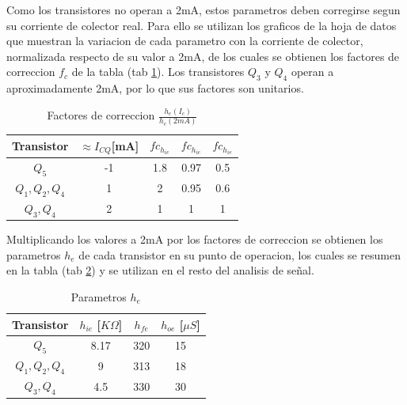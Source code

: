 \documentclass[11pt,a4paper]{article}
\begin{document}
Como los transistores no operan a 2mA, estos parametros deben corregirse segun su corriente de colector real. Para ello se utilizan los graficos de la hoja de datos que muestran la variacion de cada parametro con la corriente de colector, normalizada respecto de su valor a 2mA, de los cuales se obtienen los factores de correccion \(f_c\) de la tabla (tab \ref{tab:fc}). Los transistores \(Q_3\) y \(Q_4\) operan a aproximadamente 2mA, por lo que sus factores son unitarios.

\begin{table}
\centering
\begin{tabular}{ |c|c|c|c|c| }\hline
Transistor         & \(\approx I_{CQ}\)[mA] & \(fc_{h_{ie}}\) & \(fc_{h_{ie}}\) & \(fc_{h_{ie}}\) \\\hline
\(Q_5           \) & -1                     & 1.8             & 0.97            & 0.5             \\\hline
\(Q_1, Q_2, Q_4 \) &  1                     & 2               & 0.95            & 0.6             \\\hline
\(Q_3, Q_4      \) &  2                     & 1               & 1               & 1               \\\hline
\end{tabular}
\caption{Factores de correccion \(\frac{h_e(I_c)}{h_e(2mA)}\)}
\label{tab:fc} 
\end{table}

Multiplicando los valores a 2mA por los factores de correccion se obtienen los parametros \(h_e\) de cada transistor en su punto de operacion, los cuales se resumen en la tabla (tab \ref{tab:he}) y se utilizan en el resto del analisis de señal.

\begin{table}
\centering
\begin{tabular}{ |c|c|c|c| }\hline
Transistor         & \(h_{ie}\) [\(K\Omega\)] & \(h_{fe}\) & \(h_{oe}\) [\(\mu S\)] \\\hline
\(Q_5           \) & 8.17                     & 320        & 15                     \\\hline
\(Q_1, Q_2, Q_4 \) & 9                        & 313        & 18                     \\\hline
\(Q_3, Q_4      \) & 4.5                      & 330        & 30                     \\\hline
\end{tabular}
\caption{Parametros \(h_e\)}
\label{tab:he} 
\end{table}
\end{document}
